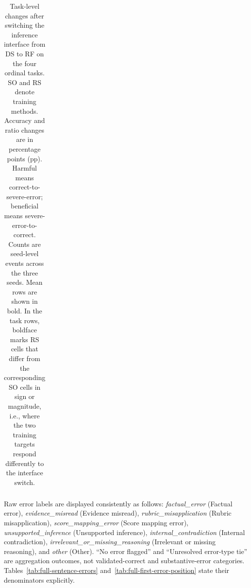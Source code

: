 \begin{table}[!tp]
\begin{tabular}{@{}llrrrrrrr@{}}
\bottomrule
\end{tabular}

\caption{Task-level changes after switching the inference interface from
DS to RF on the four ordinal tasks. SO and RS denote training methods.
Accuracy and ratio changes are in percentage points (pp). Harmful means
correct-to-severe-error; beneficial means severe-error-to-correct. Counts
are seed-level events across the three seeds. Mean rows are shown in bold.
In the task rows, boldface marks RS cells that differ from the corresponding
SO cells in sign or magnitude, i.e., where the two training targets respond
differently to the interface switch.}
\label{tab:full-interface-transitions}
\end{table}

Raw error labels are displayed consistently as follows:
\textit{factual\_error} (Factual error),
\textit{evidence\_misread} (Evidence misread),
\textit{rubric\_misapplication} (Rubric misapplication),
\textit{score\_mapping\_error} (Score mapping error),
\textit{unsupported\_inference} (Unsupported inference),
\textit{internal\_contradiction} (Internal contradiction),
\textit{irrelevant\_or\_missing\_reasoning} (Irrelevant or missing reasoning),
and \textit{other} (Other).
``No error flagged'' and ``Unresolved error-type tie'' are aggregation outcomes, not
validated-correct and substantive-error categories. Tables~\ref{tab:full-sentence-errors}
and~\ref{tab:full-first-error-position} state their denominators explicitly.

